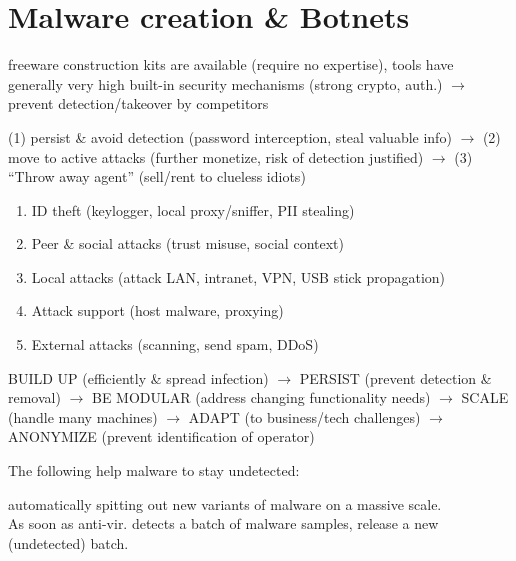 \section{Malware creation \& Botnets}

 freeware construction kits are available (require no expertise), tools have generally very high built-in security mechanisms (strong crypto, auth.) $\to$ prevent detection/takeover by competitors

 (1) persist \& avoid detection (password interception, steal valuable info) $\to$ (2) move to active attacks (further monetize, risk of detection justified) $\to$ (3) ``Throw away agent'' (sell/rent to clueless idiots)

\begin{enumerate}
\item ID theft (keylogger, local proxy/sniffer, PII stealing)
\item Peer \& social attacks (trust misuse, social context)
\item Local attacks (attack LAN, intranet, VPN, USB stick propagation)
\item Attack support (host malware, proxying)
\item External attacks (scanning, send spam, DDoS)
\end{enumerate}

 BUILD UP (efficiently \& spread infection) $\to$ PERSIST (prevent detection \& removal) $\to$ BE MODULAR (address changing functionality needs) $\to$ SCALE (handle many machines) $\to$ ADAPT (to business/tech challenges) $\to$ ANONYMIZE (prevent identification of operator) 

 The following help malware to stay undetected:

 automatically spitting out new variants of malware on a massive scale.\\
As soon as anti-vir. detects a batch of malware samples, release a new (undetected) batch.

